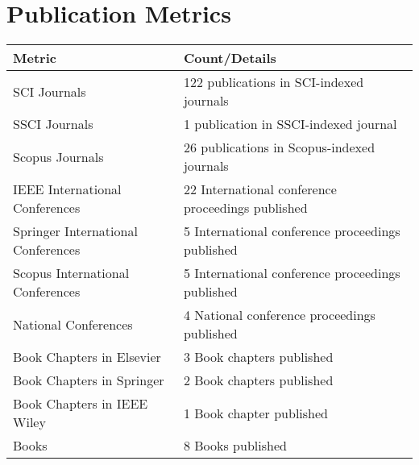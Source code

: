 \documentclass[11pt,a4paper]{moderncv}
\begin{document}
\vspace{1cm}

\section{\textbf{Publication Metrics}}

\begin{adjustwidth}{6em}{0pt}
\begin{center}
\begin{tabular}{p{7cm}p{9cm}}
	
	\hline
	\textbf{Metric} & \textbf{Count/Details} \\
	\hline
	SCI Journals& 122 publications in SCI-indexed journals \\
	SSCI Journals& 1 publication in SSCI-indexed journal \\
	Scopus Journals& 26 publications in Scopus-indexed journals \\
	IEEE International Conferences & 22 International conference proceedings published \\
	Springer International Conferences  & 5 International conference proceedings published \\
	Scopus International Conferences  & 5 International conference proceedings published \\
	National Conferences  & 4 National conference proceedings published \\
	Book Chapters in Elsevier & 3 Book chapters published \\
	Book Chapters in Springer & 2 Book chapters published \\
	Book Chapters in IEEE Wiley & 1 Book chapter published \\
	Books & 8 Books published \\
	\hline
\end{tabular}
\end{center}
\end{adjustwidth}
\end{document}
